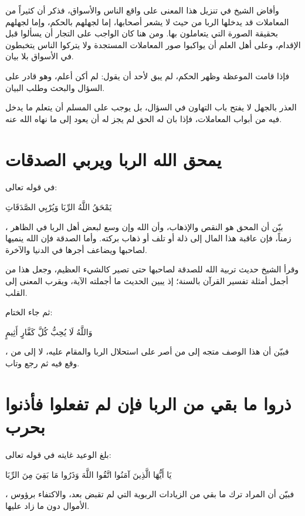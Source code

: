 وأفاض الشيخ في تنزيل هذا المعنى على واقع الناس والأسواق، فذكر أن كثيراً من المعاملات قد يدخلها الربا من حيث لا يشعر أصحابها، إما لجهلهم بالحكم، وإما لجهلهم بحقيقة الصورة التي يتعاملون بها. ومن هنا كان الواجب على التجار أن يسألوا قبل الإقدام، وعلى أهل العلم أن يواكبوا صور المعاملات المستجدة ولا يتركوا الناس يتخبطون في الأسواق بلا بيان.

فإذا قامت الموعظة وظهر الحكم، لم يبق لأحد أن يقول: لم أكن أعلم، وهو قادر على السؤال والبحث وطلب البيان.

\begin{fawaid}
العذر بالجهل لا يفتح باب التهاون في السؤال، بل يوجب على المسلم أن يتعلم ما يدخل فيه من أبواب المعاملات، فإذا بان له الحق لم يجز له أن يعود إلى ما نهاه الله عنه.
\end{fawaid}

\section{يمحق الله الربا ويربي الصدقات}
في قوله تعالى: \begin{ayah}يَمْحَقُ اللَّهُ الرِّبَا وَيُرْبِي الصَّدَقَاتِ\end{ayah}، بيّن  أن المحق هو النقص والإذهاب، وأن الله وإن وسع لبعض أهل الربا في الظاهر زمناً، فإن عاقبة هذا المال إلى ذلة أو تلف أو ذهاب بركته. وأما الصدقة فإن الله ينميها لصاحبها ويضاعف أجرها في الدنيا والآخرة.

وقرأ الشيخ حديث تربية الله للصدقة لصاحبها حتى تصير كالشيء العظيم، وجعل هذا من أجمل أمثلة تفسير القرآن بالسنة؛ إذ يبين الحديث ما أجملته الآية، ويقرب المعنى إلى القلب.

ثم جاء الختام: \begin{ayah}وَاللَّهُ لَا يُحِبُّ كُلَّ كَفَّارٍ أَثِيمٍ\end{ayah}، فبيّن  أن هذا الوصف متجه إلى من أصر على استحلال الربا والمقام عليه، لا إلى من وقع فيه ثم رجع وتاب.

\section{ذروا ما بقي من الربا فإن لم تفعلوا فأذنوا بحرب}
بلغ الوعيد غايته في قوله تعالى: \begin{ayah}يَا أَيُّهَا الَّذِينَ آمَنُوا اتَّقُوا اللَّهَ وَذَرُوا مَا بَقِيَ مِنَ الرِّبَا\end{ayah}، فبيّن  أن المراد ترك ما بقي من الزيادات الربوية التي لم تقبض بعد، والاكتفاء برؤوس الأموال دون ما زاد عليها.

